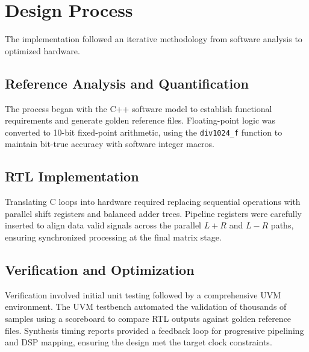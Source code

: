 \section{Design Process}
The implementation followed an iterative methodology from software analysis to optimized hardware.

\subsection{Reference Analysis and Quantification}
The process began with the C++ software model to establish functional requirements and generate golden reference files. Floating-point logic was converted to 10-bit fixed-point arithmetic, using the \texttt{div1024\_f} function to maintain bit-true accuracy with software integer macros.

\subsection{RTL Implementation}
Translating C loops into hardware required replacing sequential operations with parallel shift registers and balanced adder trees. Pipeline registers were carefully inserted to align data valid signals across the parallel $L+R$ and $L-R$ paths, ensuring synchronized processing at the final matrix stage.

\subsection{Verification and Optimization}
Verification involved initial unit testing followed by a comprehensive UVM environment. The UVM testbench automated the validation of thousands of samples using a scoreboard to compare RTL outputs against golden reference files. Synthesis timing reports provided a feedback loop for progressive pipelining and DSP mapping, ensuring the design met the target clock constraints.

